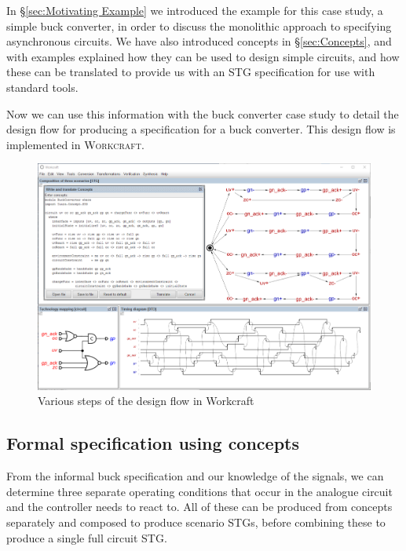 \documentclass[british,compsoc]{IEEEtran}
\newcommand{\noun}[1]{\textsc{#1}}
\begin{document}
In \S\ref{sec:Motivating Example} we introduced the example for this case study, a simple buck converter,
in order to discuss the monolithic approach to specifying asynchronous circuits. We have also introduced concepts in \S\ref{sec:Concepts},
and with examples explained how they can be used to design simple circuits, and how these can be translated to
provide us with an STG specification for use with standard tools.

Now we can use this information with the buck converter case study to detail the design flow for producing a
specification for a buck converter. This design flow is implemented in \noun{Workcraft}. 

\begin{figure}[t]
\begin{centering}
\includegraphics[scale=0.3]{Images/design_flow_wc_screenshot}
\par\end{centering}

\protect\caption{\label{fig:workcraft_screenshot} Various steps of the design flow in Workcraft}
\end{figure}

\subsection{Formal specification using concepts}

From the informal buck specification and our knowledge of the signals,
we can determine three separate operating conditions that occur in
the analogue circuit and the controller needs to react to. All of
these can be produced from concepts separately and composed to produce
scenario STGs, before combining these to produce a single full circuit
STG.
\end{document}
